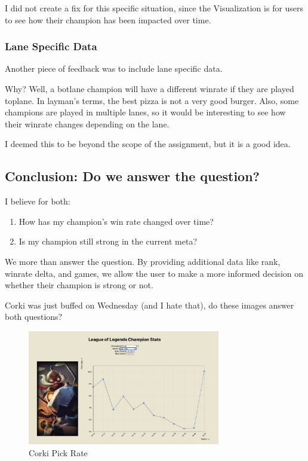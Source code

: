 \documentclass{article}
\begin{document}
I did not create a fix for this specific situation, since the Visualization is 
for users to see how their champion has been impacted over time.

\subsubsection{Lane Specific Data}
\label{subsubsec:Lane Specific Data}

Another piece of feedback was to include lane specific data.

Why? Well, a botlane champion will have a different winrate if they are played toplane. 
In layman's terms, the best pizza is not a very good burger. 
Also, some champions are played in multiple lanes, so it would be interesting to see
how their winrate changes depending on the lane.

I deemed this to be beyond the scope of the assignment, but it is a good idea.

\subsection{Conclusion: Do we answer the question?}
\label{subsec:Conclusion}

I believe for both:

\begin{enumerate}
  \item How has my champion's win rate changed over time?
  \item Is my champion still strong in the current meta?
\end{enumerate}

We more than answer the question. By providing additional data like rank,
winrate delta, and games, we allow the user to make a more informed decision
on whether their champion is strong or not.

Corki was just buffed on Wednesday (and I hate that), do these images answer both questions? 

\begin{figure}[ht] 
  \centering
  \includegraphics[width=0.75\textwidth]{figs/corki1.jpg}
  \caption{
      Corki Pick Rate
  }
\end{figure}
\end{document}
